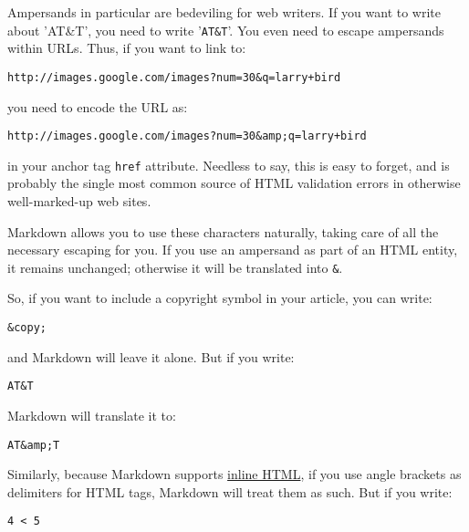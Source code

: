Ampersands in particular are bedeviling for web writers. If you want to
write about 'AT\&T', you need to write '\texttt{AT\&T}'. You even need to
escape ampersands within URLs. Thus, if you want to link to:

\begin{lstlisting}
http://images.google.com/images?num=30&q=larry+bird
\end{lstlisting}




you need to encode the URL as:

\begin{lstlisting}
http://images.google.com/images?num=30&amp;q=larry+bird
\end{lstlisting}




in your anchor tag \texttt{href} attribute. Needless to say, this is easy to
forget, and is probably the single most common source of HTML validation
errors in otherwise well-marked-up web sites.



Markdown allows you to use these characters naturally, taking care of
all the necessary escaping for you. If you use an ampersand as part of
an HTML entity, it remains unchanged; otherwise it will be translated
into \texttt{\&}.



So, if you want to include a copyright symbol in your article, you can write:

\begin{lstlisting}
&copy;
\end{lstlisting}




and Markdown will leave it alone. But if you write:

\begin{lstlisting}
AT&T
\end{lstlisting}




Markdown will translate it to:

\begin{lstlisting}
AT&amp;T
\end{lstlisting}




Similarly, because Markdown supports \href{\#html}{inline HTML}, if you use
angle brackets as delimiters for HTML tags, Markdown will treat them as
such. But if you write:

\begin{lstlisting}
4 < 5
\end{lstlisting}




